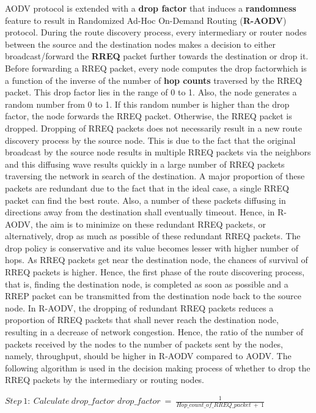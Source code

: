 \documentclass{report}
\begin{document}
AODV protocol is extended with a \textbf{drop factor} that induces a \textbf{randomness} feature
to result in Randomized Ad-Hoc On-Demand Routing (\textbf{R-AODV}) protocol. During the route discovery process, every intermediary or router nodes between the
source and the destination nodes makes a decision to either broadcast/forward
the \textbf{RREQ} packet further towards the destination or drop it. Before forwarding
a RREQ packet, every node computes the drop factorwhich is a function of the
inverse of the number of \textbf{hop counts} traversed by the RREQ packet. This drop
factor lies in the range of 0 to 1. Also, the node generates a random number
from 0 to 1. If this random number is higher than the drop factor, the node
forwards the RREQ packet. Otherwise, the RREQ packet is dropped. Dropping
of RREQ packets does not necessarily result in a new route discovery process
by the source node. This is due to the fact that the original broadcast by the
source node results in multiple RREQ packets via the neighbors and this diffusing wave results quickly in a large number of RREQ packets traversing the
network in search of the destination. A major proportion of these packets are
redundant due to the fact that in the ideal case, a single RREQ packet can
find the best route. Also, a number of these packets diffusing in directions away
from the destination shall eventually timeout. Hence, in R-AODV, the aim is to
minimize on these redundant RREQ packets, or alternatively, drop as much as
possible of these redundant RREQ packets. The drop policy is conservative and
its value becomes lesser with higher number of hops. As RREQ packets get near
the destination node, the chances of survival of RREQ packets is higher. Hence,
the first phase of the route discovering process, that is, finding the destination
node, is completed as soon as possible and a RREP packet can be transmitted
from the destination node back to the source node.
In R-AODV, the dropping of redundant RREQ packets reduces a proportion
of RREQ packets that shall never reach the destination node, resulting in a decrease of network congestion. Hence, the ratio of the number of packets received
by the nodes to the number of packets sent by the nodes, namely, throughput,
should be higher in R-AODV compared to AODV.
The following algorithm is used in the decision making process of whether to
drop the RREQ packets by the intermediary or routing nodes.

$Step\ 1:\ Calculate\ drop\_factor$
	$drop\_factor\ =\ \frac{1}{Hop\_count\_of\_RREQ\_packet\ +\ 1}$
	
\end{document}
